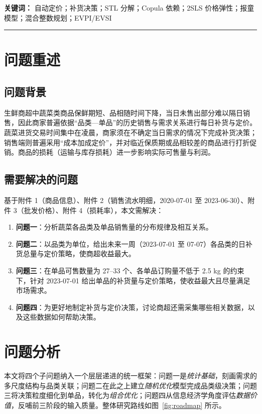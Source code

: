 \documentclass[UTF8,fontset=none,a4paper,11pt]{ctexart}
\begin{document}
\vspace{4pt}
\noindent\textbf{关键词：} 自动定价；补货决策；STL 分解；Copula 依赖；2SLS 价格弹性；报童模型；混合整数规划；EVPI/EVSI

\vspace{6pt}\hrule\vspace{6pt}

\section{问题重述}
\subsection{问题背景}
生鲜商超中蔬菜类商品保鲜期短、品相随时间下降，当日未售出部分难以隔日销售，因此商家普遍依据“品类—单品”的历史销售与需求关系进行每日补货与定价。蔬菜进货交易时间集中在凌晨，商家须在不确定当日需求的情况下完成补货决策；销售端则普遍采用“成本加成定价”，并对临近保质期或品相较差的商品进行打折促销。商品的损耗（运输与库存损耗）进一步影响实际可售量与利润。

\subsection{需要解决的问题}
基于附件 1（商品信息）、附件 2（销售流水明细，2020-07-01 至 2023-06-30）、附件 3（批发价格）、附件 4（损耗率），本文需解决：
\begin{enumerate}[leftmargin=2.2em,itemsep=2pt]
  \item \textbf{问题一}：分析蔬菜各品类及单品销售量的分布规律及相互关系。
  \item \textbf{问题二}：以品类为单位，给出未来一周（2023-07-01 至 07-07）各品类的日补货总量与定价策略，使商超收益最大。
  \item \textbf{问题三}：在单品可售数量为 27--33 个、各单品订购量不低于 2.5 kg 的约束下，针对 2023-07-01 给出单品的补货量与定价策略，使收益最大且尽量满足市场需求。
  \item \textbf{问题四}：为更好地制定补货与定价决策，讨论商超还需采集哪些相关数据，以及这些数据如何帮助决策。
\end{enumerate}

\section{问题分析}
本文将四个子问题纳入一个层层递进的统一框架：问题一是\emph{统计基础}，刻画需求的多尺度结构与品类关联；问题二在此之上建立\emph{随机优化}模型完成品类级决策；问题三将决策粒度细化到单品，转化为\emph{组合优化}；问题四从信息经济学角度评估\emph{数据价值}，反哺前三阶段的输入质量。整体研究路线如图~\ref{fig:roadmap} 所示。
\end{document}
